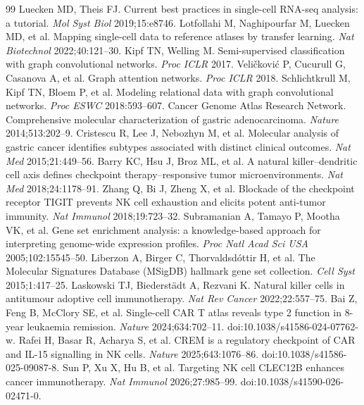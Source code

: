 \documentclass[modern,large,numbered,nocrop]{oup-authoring-template}
\begin{document}
\begin{thebibliography}{99}
 Luecken MD, Theis FJ. Current best practices in single-cell RNA-seq analysis: a tutorial. \textit{Mol Syst Biol} 2019;15:e8746.
 Lotfollahi M, Naghipourfar M, Luecken MD, et al. Mapping single-cell data to reference atlases by transfer learning. \textit{Nat Biotechnol} 2022;40:121--30.
 Kipf TN, Welling M. Semi-supervised classification with graph convolutional networks. \textit{Proc ICLR} 2017.
 Veličković P, Cucurull G, Casanova A, et al. Graph attention networks. \textit{Proc ICLR} 2018.
 Schlichtkrull M, Kipf TN, Bloem P, et al. Modeling relational data with graph convolutional networks. \textit{Proc ESWC} 2018:593--607.
 Cancer Genome Atlas Research Network. Comprehensive molecular characterization of gastric adenocarcinoma. \textit{Nature} 2014;513:202--9.
 Cristescu R, Lee J, Nebozhyn M, et al. Molecular analysis of gastric cancer identifies subtypes associated with distinct clinical outcomes. \textit{Nat Med} 2015;21:449--56.
 Barry KC, Hsu J, Broz ML, et al. A natural killer--dendritic cell axis defines checkpoint therapy--responsive tumor microenvironments. \textit{Nat Med} 2018;24:1178--91.
 Zhang Q, Bi J, Zheng X, et al. Blockade of the checkpoint receptor TIGIT prevents NK cell exhaustion and elicits potent anti-tumor immunity. \textit{Nat Immunol} 2018;19:723--32.
 Subramanian A, Tamayo P, Mootha VK, et al. Gene set enrichment analysis: a knowledge-based approach for interpreting genome-wide expression profiles. \textit{Proc Natl Acad Sci USA} 2005;102:15545--50.
 Liberzon A, Birger C, Thorvaldsdóttir H, et al. The Molecular Signatures Database (MSigDB) hallmark gene set collection. \textit{Cell Syst} 2015;1:417--25.
 Laskowski TJ, Biederstädt A, Rezvani K. Natural killer cells in antitumour adoptive cell immunotherapy. \textit{Nat Rev Cancer} 2022;22:557--75.
 Bai Z, Feng B, McClory SE, et al. Single-cell CAR T atlas reveals type 2 function in 8-year leukaemia remission. \textit{Nature} 2024;634:702--11. doi:10.1038/s41586-024-07762-w.
 Rafei H, Basar R, Acharya S, et al. CREM is a regulatory checkpoint of CAR and IL-15 signalling in NK cells. \textit{Nature} 2025;643:1076--86. doi:10.1038/s41586-025-09087-8.
 Sun P, Xu X, Hu B, et al. Targeting NK cell CLEC12B enhances cancer immunotherapy. \textit{Nat Immunol} 2026;27:985--99. doi:10.1038/s41590-026-02471-0.
\end{thebibliography}
\end{document}
